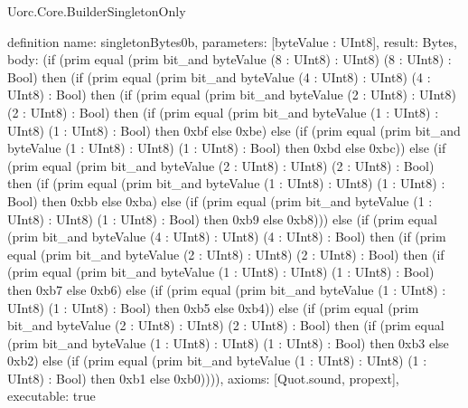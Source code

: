 \begin{lexlean}{Uorc.Core.BuilderSingletonOnly}
\begin{semanticmodule}
definition{
  name: singletonBytes0b,
  parameters: [byteValue : UInt8],
  result: Bytes,
  body: (if (prim equal (prim bit_and byteValue (8 : UInt8) : UInt8) (8 : UInt8) : Bool) then (if (prim equal (prim bit_and byteValue (4 : UInt8) : UInt8) (4 : UInt8) : Bool) then (if (prim equal (prim bit_and byteValue (2 : UInt8) : UInt8) (2 : UInt8) : Bool) then (if (prim equal (prim bit_and byteValue (1 : UInt8) : UInt8) (1 : UInt8) : Bool) then 0xbf else 0xbe) else (if (prim equal (prim bit_and byteValue (1 : UInt8) : UInt8) (1 : UInt8) : Bool) then 0xbd else 0xbc)) else (if (prim equal (prim bit_and byteValue (2 : UInt8) : UInt8) (2 : UInt8) : Bool) then (if (prim equal (prim bit_and byteValue (1 : UInt8) : UInt8) (1 : UInt8) : Bool) then 0xbb else 0xba) else (if (prim equal (prim bit_and byteValue (1 : UInt8) : UInt8) (1 : UInt8) : Bool) then 0xb9 else 0xb8))) else (if (prim equal (prim bit_and byteValue (4 : UInt8) : UInt8) (4 : UInt8) : Bool) then (if (prim equal (prim bit_and byteValue (2 : UInt8) : UInt8) (2 : UInt8) : Bool) then (if (prim equal (prim bit_and byteValue (1 : UInt8) : UInt8) (1 : UInt8) : Bool) then 0xb7 else 0xb6) else (if (prim equal (prim bit_and byteValue (1 : UInt8) : UInt8) (1 : UInt8) : Bool) then 0xb5 else 0xb4)) else (if (prim equal (prim bit_and byteValue (2 : UInt8) : UInt8) (2 : UInt8) : Bool) then (if (prim equal (prim bit_and byteValue (1 : UInt8) : UInt8) (1 : UInt8) : Bool) then 0xb3 else 0xb2) else (if (prim equal (prim bit_and byteValue (1 : UInt8) : UInt8) (1 : UInt8) : Bool) then 0xb1 else 0xb0)))),
  axioms: [Quot.sound, propext],
  executable: true
}


\end{semanticmodule}
\end{lexlean}
